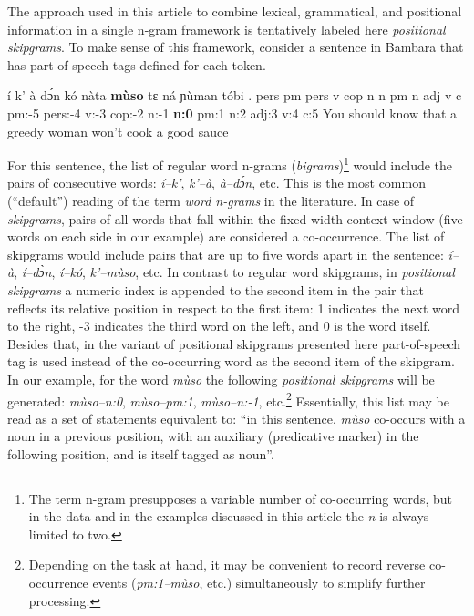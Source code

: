 \documentclass[12pt]{article}
\begin{document}
The approach used in this article to combine lexical, grammatical, and
positional information in a single n-gram framework is tentatively
labeled here \textit{positional skipgrams}.  To make sense of this
framework, consider a sentence in Bambara that has part of speech tags
defined for each token.

\begin{example}
  \small
  \label{ex:muso}
  \trigloss
  {í       k'      à       dɔ́n     kó      nàta    \textbf{mùso}    tɛ      ná      ɲùman   tóbi    .}
  {pers    pm      pers    v       cop     n       n       pm      n       adj     v       c}
  {{} pm:-5 pers:-4 v:-3 cop:-2 n:-1 \textbf{n:0} pm:1 n:2 adj:3 v:4 c:5}
  {You should know that a greedy woman won't cook a good sauce}
\end{example}

For this sentence, the list of regular word n-grams
(\textit{bigrams})\footnote{The term n-gram presupposes a variable
  number of co-occurring words, but in the data and in the examples
  discussed in this article the \textit{n} is always limited to two.}
would include the pairs of consecutive words: \textit{í--k'},
\textit{k'--à}, \textit{à--dɔ́n}, etc. This is the most common
(“default”) reading of the term \textit{word n-grams} in the
literature. In case of \textit{skipgrams}, pairs of all words that
fall within the fixed-width context window (five words on each side in
our example) are considered a co-occurrence. The list of skipgrams
would include pairs that are up to five words apart in the sentence:
\textit{í--à}, \textit{í--dɔ̀n}, \textit{í--kó}, \textit{k'--mùso},
etc.  In contrast to regular word skipgrams, in \textit{positional
  skipgrams} a numeric index is appended to the second item in the
pair that reflects its relative position in respect to the first item:
1 indicates the next word to the right, -3 indicates the third word on
the left, and 0 is the word itself. Besides that, in the variant of
positional skipgrams presented here part-of-speech tag is used instead
of the co-occurring word as the second item of the skipgram.  In our
example, for the word \textit{mùso} the following \textit{positional
  skipgrams} will be generated: \textit{mùso--n:0},
\textit{mùso--pm:1}, \textit{mùso--n:-1}, etc.\footnote{Depending on
  the task at hand, it may be convenient to record reverse
  co-occurrence events (\textit{pm:1--mùso}, etc.) simultaneously to
  simplify further processing.} Essentially, this list may be read as
a set of statements equivalent to: “in this sentence, \textit{mùso}
co-occurs with a noun in a previous position, with an auxiliary
(predicative marker) in the following position, and is itself tagged
as noun”.
\end{document}
